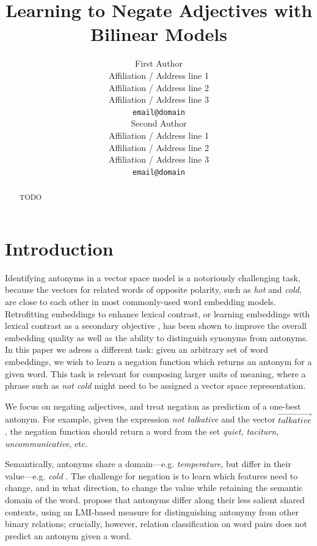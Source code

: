 \documentclass[11pt]{article}
\title{Learning to Negate Adjectives with Bilinear Models}
\author{First Author \\
  Affiliation / Address line 1 \\
  Affiliation / Address line 2 \\
  Affiliation / Address line 3 \\
  {\tt email@domain} \\\And
  Second Author \\
  Affiliation / Address line 1 \\
  Affiliation / Address line 2 \\
  Affiliation / Address line 3 \\
  {\tt email@domain} \\}
\date{}
\begin{document}
\maketitle
\begin{abstract}
 TODO
\vspace{15mm}
\end{abstract}

\section{Introduction}

Identifying antonyms in a vector space model is a notoriously
challenging task, because the vectors for related words of opposite
polarity, such as {\it hot} and {\it cold}, are close to each other in
most commonly-used word embedding models. Retrofitting embeddings to
enhance lexical contrast, or learning embeddings with lexical contrast
as a secondary objective \citep{pham:15,nguyen:16,mrksic:16}, has been
shown to improve the overall embedding quality as well as the ability
to distinguish synonyms from antonyms. In this paper we adress a
different task: given an arbitrary set of word embeddings, we wish to
learn a negation function which returns an antonym for a given
word. This task is relevant for composing larger units of meaning,
where a phrase such as {\it not cold} might need to be assigned a
vector space representation.

We focus on negating adjectives, and treat negation as prediction of a
one-best antonym. For example, given the expression {\it not
  talkative} and the vector $\overrightarrow{\textit{talkative}}$, the negation
function should return a word from the set {\it quiet, taciturn,
  uncommunicative}, etc.


Semantically, antonyms share a domain---e.g. {\it
  temperature}, but differ in their value---e.g. {\it cold}
\citep{turney:12,hermann:13}. The challenge for negation is to learn
which features need to change, and in what direction, to change the
value while retaining the semantic domain of the
word. \citet{santus:15} propose that antonyms differ along their less
salient shared contexts, using an LMI-based measure for distinguishing
antonymy from other binary relations; crucially, however, relation
classification on word pairs does not predict an antonym given a word.
\end{document}
